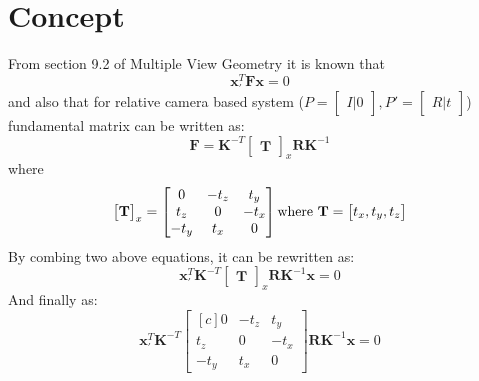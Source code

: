 \section{Concept}
From section 9.2 of Multiple View Geometry \cite{HartleyMultipleView} it is known that
\begin{equation} \label{eq:relativeFundamntal}
\textbf{x}_{'}^{T}\textbf{F}\textbf{x} = 0
\end{equation}
and also that for relative camera based system ($P = \begin{bmatrix}I |0\end{bmatrix}, P' = \begin{bmatrix}R|t\end{bmatrix}$) fundamental matrix can be written as:
\begin{equation} \label{eq:relativeFundamntal}
\textbf{F} = \textbf{K}^{-T}\begin{bmatrix}\textbf{T}\end{bmatrix}_{x}\textbf{R}\textbf{K}^{-1}
\end{equation}
where 
\begin{equation} \label{eq:skewTranslation}
\begin{bmatrix}\textbf{T}\end{bmatrix}_{x} = 
\begin{bmatrix*}[c]
 0 & -t_{z} & t_{y}\\
 t_{z} & 0 & -t_{x}\\
-t_{y} & t_{x} & 0 
\end{bmatrix*} 
\text{where \textbf{T}} = \begin{bmatrix}t_{x},t_{y},t_{z}\end{bmatrix}
\end{equation}
By combing two above equations, it can be rewritten as:
\begin{equation} \label{eq:relativeFundamntal}
\textbf{x}_{'}^{T}\textbf{K}^{-T}\begin{bmatrix}\textbf{T}\end{bmatrix}_{x}\textbf{R}\textbf{K}^{-1}\textbf{x} = 0
\end{equation}
And finally as:
\begin{equation} \label{eq:alternative3point}
\textbf{x}_{'}^{T}\textbf{K}^{-T}\begin{bmatrix*}[c]
 0 & -t_{z} & t_{y}\\
 t_{z} & 0 & -t_{x}\\
-t_{y} & t_{x} & 0 
\end{bmatrix*}\textbf{R}\textbf{K}^{-1}\textbf{x} = 0
\end{equation}
